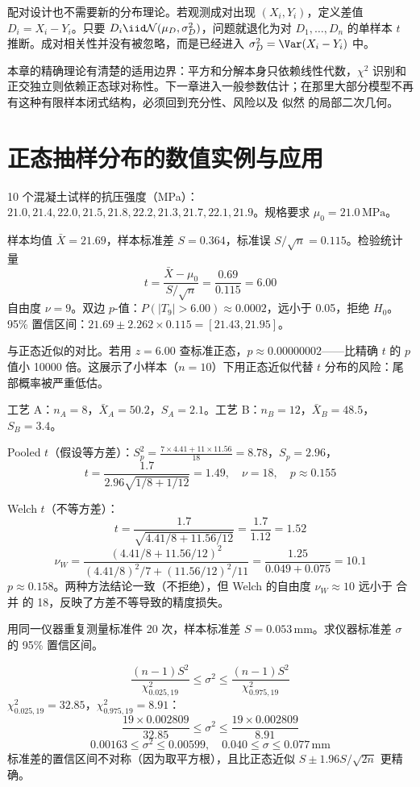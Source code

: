 配对设计也不需要新的分布理论。若观测成对出现 $(X_i,Y_i)$，定义差值 $D_i=X_i-Y_i$。只要 $D_i\iid\mathcal N(\mu_D,\sigma_D^2)$，问题就退化为对 $D_1,\ldots,D_n$ 的单样本 $t$ 推断。成对相关性并没有被忽略，而是已经进入 $\sigma_D^2=\Var(X_i-Y_i)$ 中。

本章的精确理论有清楚的适用边界：平方和分解本身只依赖线性代数，$\chi^2$ 识别和正交独立则依赖正态球对称性。下一章进入一般参数估计；在那里大部分模型不再有这种有限样本闭式结构，必须回到充分性、风险以及 似然 的局部二次几何。

\section{正态抽样分布的数值实例与应用}\label{sec:gaussian-sampling-examples}
\begin{exbox}[混凝土抗压强度检验]
10 个混凝土试样的抗压强度（MPa）：$21.0, 21.4, 22.0, 21.5, 21.8, 22.2, 21.3, 21.7, 22.1, 21.9$。规格要求 $\mu_0=21.0\,\mathrm{MPa}$。

样本均值 $\bar X=21.69$，样本标准差 $S=0.364$，标准误 $S/\sqrt{n}=0.115$。检验统计量
\[
t=\frac{\bar X-\mu_0}{S/\sqrt{n}}=\frac{0.69}{0.115}=6.00
\]
自由度 $\nu=9$。双边 $p$-值：$P(|T_9|>6.00)\approx0.0002$，远小于 0.05，拒绝 $H_0$。95\% 置信区间：$21.69\pm2.262\times0.115=[21.43,21.95]$。

与正态近似的对比。若用 $z=6.00$ 查标准正态，$p\approx0.00000002$——比精确 $t$ 的 $p$ 值小 10000 倍。这展示了小样本（$n=10$）下用正态近似代替 $t$ 分布的风险：尾部概率被严重低估。
\end{exbox}
\begin{exbox}[两种工艺的均值比较]
工艺 A：$n_A=8$，$\bar X_A=50.2$，$S_A=2.1$。工艺 B：$n_B=12$，$\bar X_B=48.5$，$S_B=3.4$。

Pooled $t$（假设等方差）：$S_p^2=\frac{7\times4.41+11\times11.56}{18}=8.78$，$S_p=2.96$，
\[
t=\frac{1.7}{2.96\sqrt{1/8+1/12}}=1.49,\quad\nu=18,\quad p\approx0.155
\]

Welch $t$（不等方差）：
\[
t=\frac{1.7}{\sqrt{4.41/8+11.56/12}}=\frac{1.7}{1.12}=1.52
\]
\[
\nu_W=\frac{(4.41/8+11.56/12)^2}{(4.41/8)^2/7+(11.56/12)^2/11}=\frac{1.25}{0.049+0.075}=10.1
\]
$p\approx0.158$。两种方法结论一致（不拒绝），但 Welch 的自由度 $\nu_W\approx10$ 远小于 合并 的 18，反映了方差不等导致的精度损失。
\end{exbox}
\begin{exbox}[仪器精度的置信区间]
用同一仪器重复测量标准件 20 次，样本标准差 $S=0.053\,\mathrm{mm}$。求仪器标准差 $\sigma$ 的 95\% 置信区间。

\[
\frac{(n-1)S^2}{\chi^2_{0.025,19}}\le\sigma^2\le\frac{(n-1)S^2}{\chi^2_{0.975,19}}
\]
$\chi^2_{0.025,19}=32.85$，$\chi^2_{0.975,19}=8.91$：
\[
\frac{19\times0.002809}{32.85}\le\sigma^2\le\frac{19\times0.002809}{8.91}
\]
\[
0.00163\le\sigma^2\le0.00599,\quad 0.040\le\sigma\le0.077\,\mathrm{mm}
\]
标准差的置信区间不对称（因为取平方根），且比正态近似 $S\pm1.96S/\sqrt{2n}$ 更精确。
\end{exbox}
